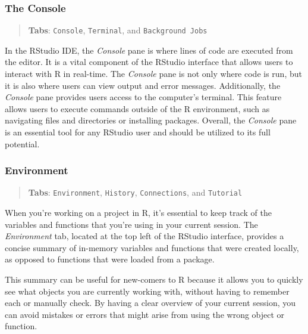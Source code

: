 \documentclass[
]{book}
\begin{document}
\hypertarget{the-console}{%
\subsubsection*{The Console}\label{the-console}}

\begin{quote}
\textbf{Tabs}: \texttt{Console}, \texttt{Terminal}, and \texttt{Background\ Jobs}
\end{quote}

In the RStudio IDE, the \emph{Console} pane is where lines of code are executed from the editor. It is a vital component of the RStudio interface that allows users to interact with R in real-time. The \emph{Console} pane is not only where code is run, but it is also where users can view output and error messages. Additionally, the \emph{Console} pane provides users access to the computer's terminal. This feature allows users to execute commands outside of the R environment, such as navigating files and directories or installing packages. Overall, the \emph{Console} pane is an essential tool for any RStudio user and should be utilized to its full potential.

\hypertarget{environment}{%
\subsubsection*{Environment}\label{environment}}

\begin{quote}
\textbf{Tabs}: \texttt{Environment}, \texttt{History}, \texttt{Connections}, and \texttt{Tutorial}
\end{quote}

When you're working on a project in R, it's essential to keep track of the variables and functions that you're using in your current session. The \emph{Environment} tab, located at the top left of the RStudio interface, provides a concise summary of in-memory variables and functions that were created locally, as opposed to functions that were loaded from a package.

This summary can be useful for new-comers to R because it allows you to quickly see what objects you are currently working with, without having to remember each or manually check. By having a clear overview of your current session, you can avoid mistakes or errors that might arise from using the wrong object or function.
\end{document}
